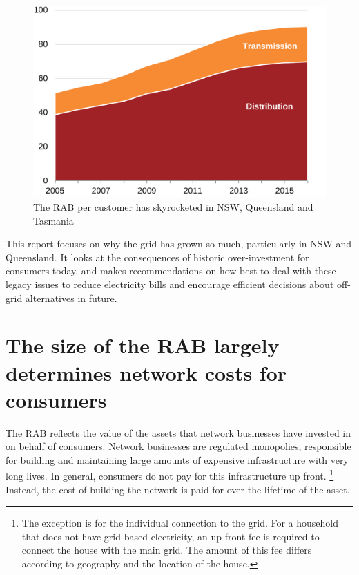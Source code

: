 \documentclass[FrontPage]{grattan}
\begin{document}
\begin{figure}
\caption{The RAB per customer has skyrocketed in NSW, Queensland and Tasmania}\label{fig:RAB-per-customer-over-time}
\includegraphics[page=24]{atlas/Charts.pdf}
\end{figure}

This report focuses on why the grid has grown so much, particularly in NSW and Queensland. It looks at the consequences of historic over-investment for consumers today, and makes recommendations on how best to deal with these legacy issues to reduce electricity bills and encourage efficient decisions about off-grid alternatives in future. 

\section{The size of the RAB largely determines network costs for consumers}\label{subsec:reg-model-for-networks}
The RAB reflects the value of the assets that network businesses have invested in on behalf of consumers. Network businesses are regulated monopolies, responsible for building and maintaining large amounts of expensive infrastructure with very long lives. In general, consumers do not pay for this infrastructure up front.%
\footnote{The exception is for the individual connection to the grid. For a household that does not have grid-based electricity, an up-front fee is required to connect the house with the main grid. The amount of this fee differs according to geography and the location of the house.}
Instead, the cost of building the network is paid for over the lifetime of the asset. 
\end{document}
